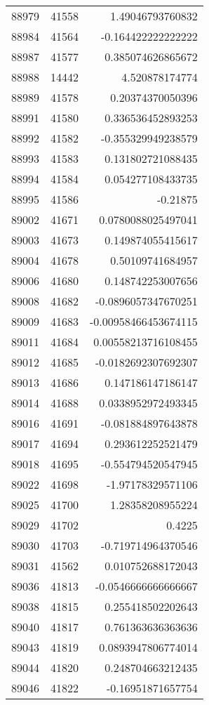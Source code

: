 \begin{tabular}{r | r | r}
88979 & 41558 & 1.49046793760832 \\
88984 & 41564 & -0.164422222222222 \\
88987 & 41577 & 0.385074626865672 \\
88988 & 14442 & 4.520878174774 \\
88989 & 41578 & 0.20374370050396 \\
88991 & 41580 & 0.336536452893253 \\
88992 & 41582 & -0.355329949238579 \\
88993 & 41583 & 0.131802721088435 \\
88994 & 41584 & 0.054277108433735 \\
88995 & 41586 & -0.21875 \\
89002 & 41671 & 0.0780088025497041 \\
89003 & 41673 & 0.149874055415617 \\
89004 & 41678 & 0.50109741684957 \\
89006 & 41680 & 0.148742253007656 \\
89008 & 41682 & -0.0896057347670251 \\
89009 & 41683 & -0.00958466453674115 \\
89011 & 41684 & 0.00558213716108455 \\
89012 & 41685 & -0.0182692307692307 \\
89013 & 41686 & 0.147186147186147 \\
89014 & 41688 & 0.0338952972493345 \\
89016 & 41691 & -0.081884897643878 \\
89017 & 41694 & 0.293612252521479 \\
89018 & 41695 & -0.554794520547945 \\
89022 & 41698 & -1.97178329571106 \\
89025 & 41700 & 1.28358208955224 \\
89029 & 41702 & 0.4225 \\
89030 & 41703 & -0.719714964370546 \\
89031 & 41562 & 0.010752688172043 \\
89036 & 41813 & -0.0546666666666667 \\
89038 & 41815 & 0.255418502202643 \\
89040 & 41817 & 0.761363636363636 \\
89043 & 41819 & 0.0893947806774014 \\
89044 & 41820 & 0.248704663212435 \\
89046 & 41822 & -0.16951871657754 \\

\end{tabular}
